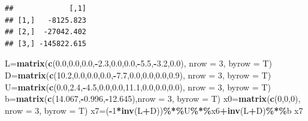 \documentclass[
]{article}
\newenvironment{Shaded}{\begin{snugshade}}{\end{snugshade}}
\newcommand{\AttributeTok}[1]{\textcolor[rgb]{0.13,0.29,0.53}{#1}}
\newcommand{\DecValTok}[1]{\textcolor[rgb]{0.00,0.00,0.81}{#1}}
\newcommand{\FloatTok}[1]{\textcolor[rgb]{0.00,0.00,0.81}{#1}}
\newcommand{\FunctionTok}[1]{\textcolor[rgb]{0.13,0.29,0.53}{\textbf{#1}}}
\newcommand{\NormalTok}[1]{#1}
\newcommand{\OtherTok}[1]{\textcolor[rgb]{0.56,0.35,0.01}{#1}}
\newcommand{\SpecialCharTok}[1]{\textcolor[rgb]{0.81,0.36,0.00}{\textbf{#1}}}
\begin{document}
\begin{verbatim}
##             [,1]
## [1,]   -8125.823
## [2,]  -27042.402
## [3,] -145822.615
\end{verbatim}

\begin{Shaded}
\begin{Highlighting}[]
\NormalTok{  L}\OtherTok{=}\FunctionTok{matrix}\NormalTok{(}\FunctionTok{c}\NormalTok{(}\FloatTok{0.0}\NormalTok{,}\FloatTok{0.0}\NormalTok{,}\FloatTok{0.0}\NormalTok{,}\SpecialCharTok{{-}}\FloatTok{2.3}\NormalTok{,}\FloatTok{0.0}\NormalTok{,}\FloatTok{0.0}\NormalTok{,}\SpecialCharTok{{-}}\FloatTok{5.5}\NormalTok{,}\SpecialCharTok{{-}}\FloatTok{3.2}\NormalTok{,}\FloatTok{0.0}\NormalTok{), }\AttributeTok{nrow =} \DecValTok{3}\NormalTok{, }\AttributeTok{byrow =}\NormalTok{ T)}
\NormalTok{  D}\OtherTok{=}\FunctionTok{matrix}\NormalTok{(}\FunctionTok{c}\NormalTok{(}\FloatTok{10.2}\NormalTok{,}\FloatTok{0.0}\NormalTok{,}\FloatTok{0.0}\NormalTok{,}\FloatTok{0.0}\NormalTok{,}\SpecialCharTok{{-}}\FloatTok{7.7}\NormalTok{,}\FloatTok{0.0}\NormalTok{,}\FloatTok{0.0}\NormalTok{,}\FloatTok{0.0}\NormalTok{,}\FloatTok{0.9}\NormalTok{), }\AttributeTok{nrow =} \DecValTok{3}\NormalTok{, }\AttributeTok{byrow =}\NormalTok{ T)}
\NormalTok{  U}\OtherTok{=}\FunctionTok{matrix}\NormalTok{(}\FunctionTok{c}\NormalTok{(}\FloatTok{0.0}\NormalTok{,}\FloatTok{2.4}\NormalTok{,}\SpecialCharTok{{-}}\FloatTok{4.5}\NormalTok{,}\FloatTok{0.0}\NormalTok{,}\FloatTok{0.0}\NormalTok{,}\FloatTok{11.1}\NormalTok{,}\FloatTok{0.0}\NormalTok{,}\FloatTok{0.0}\NormalTok{,}\FloatTok{0.0}\NormalTok{), }\AttributeTok{nrow =} \DecValTok{3}\NormalTok{, }\AttributeTok{byrow =}\NormalTok{ T)}
\NormalTok{  b}\OtherTok{=}\FunctionTok{matrix}\NormalTok{(}\FunctionTok{c}\NormalTok{(}\FloatTok{14.067}\NormalTok{,}\SpecialCharTok{{-}}\FloatTok{0.996}\NormalTok{,}\SpecialCharTok{{-}}\FloatTok{12.645}\NormalTok{),}\AttributeTok{nrow =} \DecValTok{3}\NormalTok{, }\AttributeTok{byrow =}\NormalTok{ T)}
\NormalTok{  x0}\OtherTok{=}\FunctionTok{matrix}\NormalTok{(}\FunctionTok{c}\NormalTok{(}\DecValTok{0}\NormalTok{,}\DecValTok{0}\NormalTok{,}\DecValTok{0}\NormalTok{), }\AttributeTok{nrow =} \DecValTok{3}\NormalTok{, }\AttributeTok{byrow =}\NormalTok{ T)}
\NormalTok{ x7}\OtherTok{=}\NormalTok{(}\SpecialCharTok{{-}}\DecValTok{1}\SpecialCharTok{*}\FunctionTok{inv}\NormalTok{(L}\SpecialCharTok{+}\NormalTok{D))}\SpecialCharTok{\%*\%}\NormalTok{U}\SpecialCharTok{\%*\%}\NormalTok{x6}\SpecialCharTok{+}\FunctionTok{inv}\NormalTok{(L}\SpecialCharTok{+}\NormalTok{D)}\SpecialCharTok{\%*\%}\NormalTok{b}
\NormalTok{x7}
\end{Highlighting}
\end{Shaded}
\end{document}
